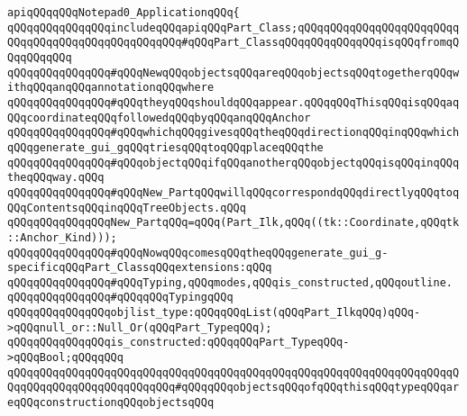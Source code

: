 \newline
\newline
\verb|apiqQQqqQQqNotepad0_ApplicationqQQq{|\newline
\newline
\verb|qQQqqQQqqQQqqQQqincludeqQQqapiqQQqPart_Class;qQQqqQQqqQQqqQQqqQQqqQQqqQQqqQQqqQQqqQQqqQQqqQQqqQQq#qQQqPart_ClassqQQqqQQqqQQqqQQqisqQQqfromqQQqqQQqqQQq|\newline
\newline
\verb|qQQqqQQqqQQqqQQq#qQQqNewqQQqobjectsqQQqareqQQqobjectsqQQqtogetherqQQqwithqQQqanqQQqannotationqQQqwhere|\newline
\verb|qQQqqQQqqQQqqQQq#qQQqtheyqQQqshouldqQQqappear.qQQqqQQqThisqQQqisqQQqaqQQqcoordinateqQQqfollowedqQQqbyqQQqanqQQqAnchor|\newline
\verb|qQQqqQQqqQQqqQQq#qQQqwhichqQQqgivesqQQqtheqQQqdirectionqQQqinqQQqwhichqQQqgenerate_gui_gqQQqtriesqQQqtoqQQqplaceqQQqthe|\newline
\verb|qQQqqQQqqQQqqQQq#qQQqobjectqQQqifqQQqanotherqQQqobjectqQQqisqQQqinqQQqtheqQQqway.qQQq|\newline
\verb|qQQqqQQqqQQqqQQq#qQQqNew_PartqQQqwillqQQqcorrespondqQQqdirectlyqQQqtoqQQqContentsqQQqinqQQqTreeObjects.qQQq|\newline
\newline
\verb|qQQqqQQqqQQqqQQqNew_PartqQQq=qQQq(Part_Ilk,qQQq((tk::Coordinate,qQQqtk::Anchor_Kind)));|\newline
\newline
\verb|qQQqqQQqqQQqqQQq#qQQqNowqQQqcomesqQQqtheqQQqgenerate_gui_g-specificqQQqPart_ClassqQQqextensions:qQQq|\newline
\verb|qQQqqQQqqQQqqQQq#qQQqTyping,qQQqmodes,qQQqis_constructed,qQQqoutline.|\newline
\newline
\verb|qQQqqQQqqQQqqQQq#qQQqqQQqTypingqQQq|\newline
\newline
\verb|qQQqqQQqqQQqqQQqobjlist_type:qQQqqQQqList(qQQqPart_IlkqQQq)qQQq->qQQqnull_or::Null_Or(qQQqPart_TypeqQQq);|\newline
\newline
\verb|qQQqqQQqqQQqqQQqis_constructed:qQQqqQQqPart_TypeqQQq->qQQqBool;qQQqqQQq|\newline
\verb|qQQqqQQqqQQqqQQqqQQqqQQqqQQqqQQqqQQqqQQqqQQqqQQqqQQqqQQqqQQqqQQqqQQqqQQqqQQqqQQqqQQqqQQqqQQqqQQq#qQQqqQQqobjectsqQQqofqQQqthisqQQqtypeqQQqareqQQqconstructionqQQqobjectsqQQq|\newline
